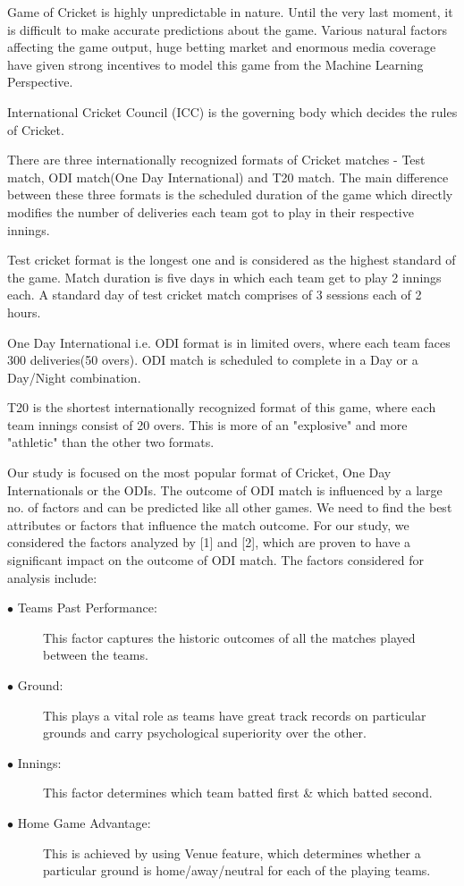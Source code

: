 \documentclass[a4paper, 10pt, conference]{IEEEtran}
\begin{document}
Game of Cricket is highly unpredictable in nature. Until the very last moment, it is difficult to make accurate predictions about the game. Various natural factors affecting the game output, huge betting market and enormous media coverage have given strong incentives to model this game from the Machine Learning Perspective.

International Cricket Council (ICC) is the governing body which decides the rules of Cricket.

There are three internationally recognized formats of Cricket matches - Test match, ODI match(One Day International) and T20 match. The main difference between these three formats is the scheduled duration of the game which directly modifies the number of deliveries each team got to play in their respective innings.

Test cricket format is the longest one and is considered as the highest standard of the game. Match duration is five days in which each team get to play 2 innings each. A standard day of test cricket match comprises of 3 sessions each of 2 hours.

One Day International i.e. ODI format is in limited overs, where each team faces 300 deliveries(50 overs). ODI match is scheduled to complete in a Day or a Day/Night combination. 

T20 is the shortest internationally recognized format of this game, where each team innings consist of 20 overs. This is more of an "explosive" and more "athletic" than the other two formats.

Our study is focused on the most popular format of Cricket, One Day Internationals or the ODIs. The outcome of ODI match is influenced by a large no. of factors and can be predicted like all other 
games. We need to find the best attributes or factors that influence the match outcome. For our study, we considered the factors analyzed by [1] and [2], which are proven to have a significant impact on the outcome of ODI match. The factors considered for analysis include:

\begin{description}
  \item[$\bullet$ Teams Past Performance:] This factor captures the historic outcomes of all the matches played between the teams.
  \item[$\bullet$ Ground:] This plays a vital role as teams have great track records on particular grounds and carry psychological superiority over the other.
  \item[$\bullet$ Innings:] This factor determines which team batted first \& which batted second.
  \item[$\bullet$ Home Game Advantage:] This is achieved by using Venue feature, which determines whether a particular ground is home/away/neutral for each of the playing teams.
\end{description}
\end{document}
